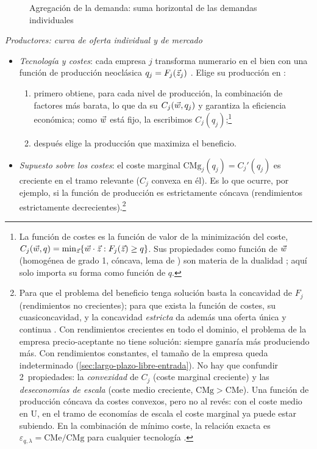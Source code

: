 \documentclass[11pt]{article}
\begin{document}
\begin{figure}[H]
\centering
\caption{Agregación de la demanda: suma horizontal de las demandas individuales}\label{fig:agregacion-demanda}
\end{figure}

\hspace*{3.6em}\emph{Productores: curva de oferta individual y de mercado}

\begin{itemize}
\item \emph{Tecnología y costes}: cada empresa $j$ transforma numerario en el bien con una función de producción neoclásica $q_j=F_j(\vec{z}_j)$ . Elige su producción en  :
  \begin{enumerate}
  \item primero obtiene, para cada nivel de producción, la combinación de factores más barata, lo que da su  $C_j(\vec{w},q_j)$ y garantiza la eficiencia económica; como $\vec{w}$ está fijo, la escribimos $C_j(q_j)$;\footnote{La función de costes es la función de valor de la minimización del coste, $C_j(\vec{w},q)=\min_{\vec{z}}\{\vec{w}\cdot\vec{z}:F_j(\vec{z})\geq q\}$. Sus propiedades como función de $\vec{w}$ (homogénea de grado 1, cóncava, lema de ) son materia de la dualidad ; aquí solo importa su forma como función de $q$.}
  \item después elige la producción que maximiza el beneficio.
  \end{enumerate}
\item \emph{Supuesto sobre los costes}: el coste marginal $\mathrm{CMg}_j(q_j)=C_j'(q_j)$ es creciente en el tramo relevante ($C_j$ convexa en él). Es lo que ocurre, por ejemplo, si la función de producción es estrictamente cóncava (rendimientos estrictamente decrecientes).\footnote{Para que el problema del beneficio tenga solución basta la concavidad de $F_j$ (rendimientos no crecientes); para que exista la función de costes, su cuasiconcavidad, y la concavidad \emph{estricta} da además una oferta única y continua . Con rendimientos crecientes en todo el dominio, el problema de la empresa precio-aceptante no tiene solución: siempre ganaría más produciendo más. Con rendimientos constantes, el tamaño de la empresa queda indeterminado (\ref{sec:largo-plazo-libre-entrada}). No hay que confundir 2~propiedades: la \emph{convexidad} de $C_j$ (coste marginal creciente) y las \emph{deseconomías de escala} (coste medio creciente, $\mathrm{CMg}>\mathrm{CMe}$). Una función de producción cóncava da costes convexos, pero no al revés: con el coste medio en U, en el tramo de economías de escala el coste marginal ya puede estar subiendo. En la combinación de mínimo coste, la relación exacta es $\varepsilon_{q,\lambda}=\mathrm{CMe}/\mathrm{CMg}$ para cualquier tecnología .}

\end{itemize}
\end{document}
